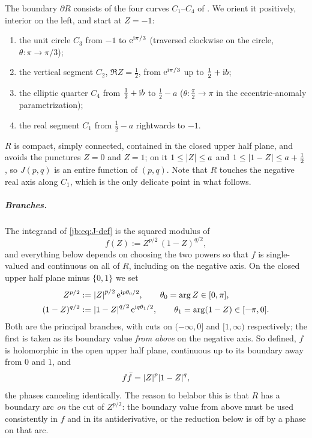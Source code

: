 The boundary $\partial R$ consists of the four curves $C_1$--$C_4$ of
\cite{Erbin:2023:SL2CQuarticVertex}.
We orient it positively, interior on the left, and start at $Z = -1$:
\begin{enumerate}
  \setlength{\itemsep}{0.3ex}

  \item the unit circle $C_3$ from $-1$ to $\mathrm{e}^{\mathrm{i} \pi/3}$ (traversed clockwise on the circle,
    $\theta : \pi \to \pi/3$);

  \item the vertical segment $C_2$, $\Re Z = \tfrac12$, from $\mathrm{e}^{\mathrm{i} \pi/3}$ up to
    $\tfrac12 + \mathrm{i} b$;

  \item the elliptic quarter $C_4$ from $\tfrac12 + \mathrm{i} b$ to $\tfrac12 - a$
    ($\theta : \tfrac{\pi}{2} \to \pi$ in the eccentric-anomaly parametrization);

  \item the real segment $C_1$ from $\tfrac12 - a$ rightwards to $-1$.
\end{enumerate}
$R$ is compact, simply connected, contained in the closed upper half plane, and avoids the
punctures $Z = 0$ and $Z = 1$; on it $1 \le {|Z|} \le a$ and $1 \le {|1 - Z|} \le a + \tfrac12$,
so $J(p, q)$ is an entire function of $(p, q)$.
Note that $R$ touches the negative real axis along $C_1$, which is the only delicate point in what
follows.

\subparagraph{Branches.}
The integrand of \eqref{jb:eq:J-def} is the squared modulus of
\begin{equation}
  \label{jb:eq:f-def}
  f(Z)
    := Z^{p/2} \, (1 - Z)^{q/2},
\end{equation}
and everything below depends on choosing the two powers so that $f$ is single-valued and continuous
on all of $R$, including on the negative axis.
On the closed upper half plane minus $\{0, 1\}$ we set
\begin{subequations}
  \label{jb:eq:branches}
\begin{align}
  Z^{p/2}
    &
    := {|Z|}^{p/2} \, \mathrm{e}^{\mathrm{i} p \theta_0 / 2},
  \qquad
  \theta_0
    = \arg Z
    \in [0, \pi],
  \\
  (1 - Z)^{q/2}
    &
    := {|1 - Z|}^{q/2} \, \mathrm{e}^{\mathrm{i} q \theta_1 / 2},
  \qquad
  \theta_1
    = \arg(1 - Z)
    \in [-\pi, 0].
\end{align}
\end{subequations}
Both are the principal branches, with cuts on $(-\infty, 0]$ and $[1, \infty)$ respectively; the
first is taken as its boundary value \emph{from above} on the negative axis.
So defined, $f$ is holomorphic in the open upper half plane, continuous up to its boundary away from
$0$ and $1$, and
\begin{equation}
  \label{jb:eq:modulus}
  f \bar f
    = {|Z|}^{p} {|1 - Z|}^{q},
\end{equation}
the phases canceling identically.
The reason to belabor this is that $R$ has a boundary arc \emph{on} the cut of $Z^{p/2}$: the
boundary value from above must be used consistently in $f$ and in its antiderivative, or the
reduction below is off by a phase on that arc.

